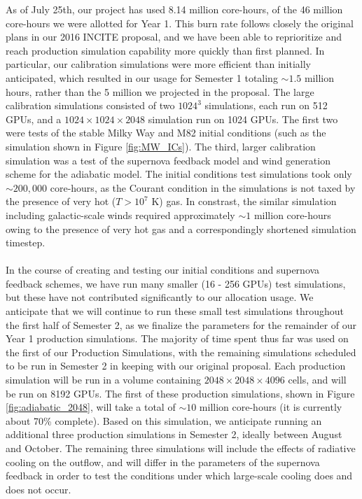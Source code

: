 \documentclass[11pt,letterpaper,english]{article}
\begin{document}
As of July 25th, our project has used 8.14 million core-hours, of the 46 million core-hours we were allotted for Year 1. This burn rate follows closely the original plans in our 2016 INCITE proposal, and we have been
able to reprioritize and reach production simulation capability more quickly than first planned. In particular, our calibration simulations were more efficient than initially anticipated, which resulted in our usage for Semester 1 totaling $\sim1.5$ million hours, rather than the 5 million we projected in the proposal. The large calibration simulations consisted of two $1024^3$ simulations, each run on 512 GPUs, and a $1024\times1024\times2048$ simulation run on 1024 GPUs. The first two were tests of the stable Milky Way and M82 initial conditions (such as the simulation shown in Figure \ref{fig:MW_ICs}). The third, larger calibration simulation was a test of the supernova feedback model and wind generation scheme for the adiabatic model. The initial conditions test simulations took only $\sim200,000$ core-hours, as the Courant condition in the simulations is not
taxed by the presence of very hot ($T > 10^7$ K) gas. In constrast, the similar simulation 
including galactic-scale winds required approximately $\sim1$ million core-hours owing to the 
presence of very hot gas and a correspondingly shortened simulation timestep.
~\\~\\
In the course of creating and testing our initial conditions and supernova feedback schemes, we have run many smaller (16 - 256 GPUs) test simulations, but these have not contributed significantly to our allocation usage. We anticipate that we will continue to run these small test simulations throughout the first half of Semester 2, as we finalize the parameters for the remainder of our Year 1 production simulations. The majority of time spent thus far was used on the first of our Production Simulations, with the remaining simulations scheduled to be run in Semester 2 in keeping with our original proposal. Each production simulation will be run in a volume containing $2048\times2048\times4096$ cells, and will be run on 8192 GPUs. The first of these production simulations, shown in Figure \ref{fig:adiabatic_2048}, will take a total of $\sim10$ million core-hours (it is currently about 70\% complete). Based on this simulation, we anticipate running an additional three production simulations in Semester 2, ideally between August and October. The remaining three simulations will include the effects of radiative cooling on the outflow, and will differ in the parameters of the supernova feedback in order to test the conditions under which large-scale cooling does and does not occur.
\end{document}
